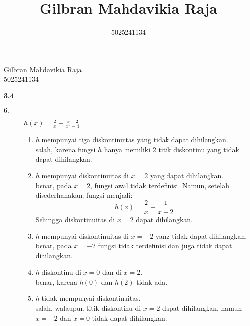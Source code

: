 \documentclass{article}
\title{Gilbran Mahdavikia Raja}
\author{5025241134}
\begin{document}
\begin{flushleft}
    Gilbran Mahdavikia Raja \\
    5025241134 \\
\end{flushleft}
{\Large \textbf{3.4}}
\begin{description}
    \item[$6.$]
    $h(x) = \frac{2}{x} + \frac{x-2}{x^2-4}$
    \begin{enumerate}[label=(\alph*)]
        \item $h$ mempunyai tiga diskontinuitas yang tidak dapat dihilangkan.\\ salah, karena fungsi $h$ hanya memiliki 2 titik diskontinu yang tidak dapat dihilangkan.
        \item $h$ mempunyai diskontinuitas di $x = 2$ yang dapat dihilangkan. \\ 
        benar, pada \( x = 2 \), fungsi awal tidak terdefinisi. Namun, setelah disederhanakan, fungsi menjadi:
        \[h(x) = \frac{2}{x} + \frac{1}{x+2}\]
        Sehingga diskontinuitas di \( x = 2 \) dapat dihilangkan.
        \item $h$ mempunyai diskontinuitas di $ x = -2 $ yang tidak dapat dihilangkan.\\
        benar, pada $x = -2$ fungsi tidak terdefinisi dan juga tidak dapat dihilangkan.
        \item $h$ diskontinu di $ x = 0 $ dan di $ x = 2 $.\\ benar, karena $h(0)$ dan $h(2)$ tidak ada.
        \item $h$ tidak mempunyai diskontinuitas.\\
        salah, walaupun titik diskontinu di $x = 2$ dapat dihilangkan, namun $x = -2$ dan $x = 0$ tidak dapat dihilangkan.
    \end{enumerate}
\end{description}
\end{document}

